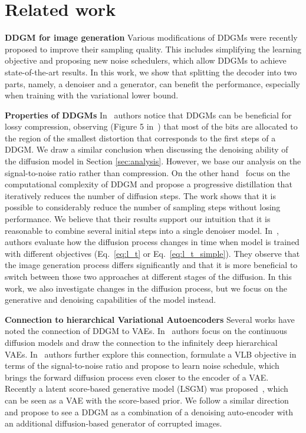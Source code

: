 \section{Related work}

\textbf{DDGM for image generation} 
Various modifications of DDGMs were recently proposed to improve their sampling quality. This includes simplifying the learning objective and proposing new noise schedulers, which allow DDGMs to achieve state-of-the-art results. In this work, we show that splitting the decoder into two parts, namely, a denoiser and a generator, can benefit the performance, especially when training with the variational lower bound.

\textbf{Properties of DDGMs} 
In~\cite{ho2020denoising} authors notice that DDGMs can be beneficial for lossy compression, observing (Figure 5 in~\cite{ho2020denoising}) that most of the bits are allocated to the region of the smallest distortion that corresponds to the first steps of a DDGM. 
We draw a similar conclusion when discussing the denoising ability of the diffusion model in Section \ref{sec:analysis}. However, we base our analysis on the signal-to-noise ratio rather than compression. On the other hand~\cite{salimans2022progressive} focus on the computational complexity of DDGM and propose a progressive distillation that iteratively reduces the number of diffusion steps. The work shows that it is possible to considerably reduce the number of sampling steps without losing performance. We believe that their results support our intuition that it is reasonable to combine several initial steps into a single denoiser model. In~\cite{benny2022dynamic}, authors evaluate how the diffusion process changes in time when model is trained with different objectives (Eq.~\ref{eq:l_t} or Eq.~\ref{eq:l_t_simple}). They observe that the image generation process differs significantly and that it is more beneficial to switch between those two approaches at different stages of the diffusion. 
In this work, we also investigate changes in the diffusion process, but we focus on the generative and denoising capabilities of the model instead.

\textbf{Connection to hierarchical Variational Autoencoders} Several works have noted the connection of DDGM to VAEs. In~\cite{huang2021variational} authors focus on the continuous diffusion models and draw the connection to the infinitely deep hierarchical VAEs. In~\cite{kingma2021variational} authors further explore this connection, formulate a VLB objective in terms of the signal-to-noise ratio and propose to learn noise schedule, which brings the forward diffusion process even closer to the encoder of a VAE. 
Recently a latent score-based generative model (LSGM) was proposed~\cite{vahdat2021score}, which can be seen as a VAE with the score-based prior. We follow a similar direction and propose to see a DDGM as a combination of a denoising auto-encoder with an additional diffusion-based generator of corrupted images.
